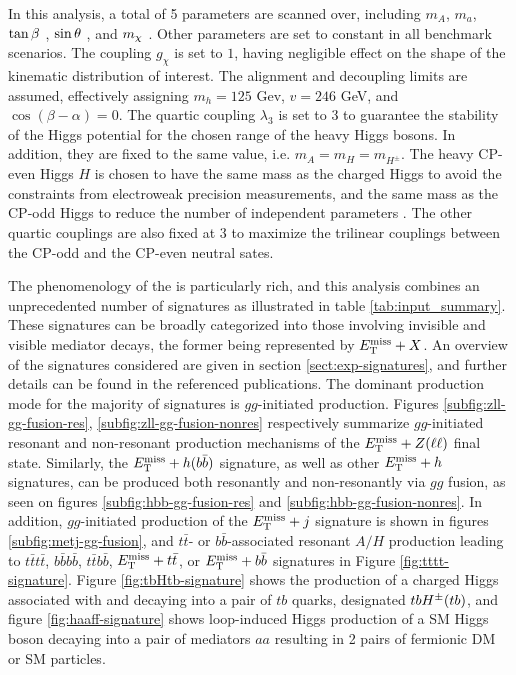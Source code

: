 In this analysis, a total of 5 parameters are scanned over, including $m_A$, $m_a$, $\tan\beta~$, $\sin\theta~$, and $m_{\chi}~$. Other parameters are set to constant in all benchmark scenarios. The coupling $g_{\chi}$ is set to $1$, having negligible effect on the shape of the kinematic distribution of interest. The alignment and decoupling limits are assumed, effectively assigning $m_h=125$ Gev, $v=246$ GeV, and $\cos(\beta-\alpha)=0$. The quartic coupling $\lambda_3$ is set to 3 to guarantee the stability of the Higgs potential for the chosen range of the heavy Higgs bosons. In addition, they are fixed to the same value, i.e. $m_A= m_H=m_{H^{\pm}}$. The heavy CP-even Higgs $H$ is chosen to have the same mass as the charged Higgs to avoid the constraints from electroweak precision measurements, and the same mass as the CP-odd Higgs to reduce the number of independent parameters \cite{Bauer:2017ota}. The other quartic couplings are also fixed at 3 to maximize the trilinear couplings between the CP-odd and the CP-even neutral sates. 

The phenomenology of the \thdma is particularly rich, and this analysis combines an unprecedented number of signatures as illustrated in table \ref{tab:input_summary}.
These signatures can be broadly categorized into those involving invisible and visible mediator decays, the former being represented by $E_{\mathrm{T}}^{\mathrm{miss}}+X$. An overview of the signatures considered are given in section \ref{sect:exp-signatures}, and further details can be found in the referenced publications. The dominant production mode for the majority of signatures is $gg$-initiated production. 
Figures \ref{subfig:zll-gg-fusion-res}, \ref{subfig:zll-gg-fusion-nonres} respectively summarize $gg$-initiated resonant and non-resonant production mechanisms of the $E_{\mathrm{T}}^{\mathrm{miss}}+Z(\ell\ell)$ final state. 
Similarly, the $E_{\mathrm{T}}^{\mathrm{miss}}+h(b\bar{b})$ signature, as well as other $E_{\mathrm{T}}^{\mathrm{miss}}+h$ signatures, can be produced both resonantly and non-resonantly via $gg$ fusion, as seen on figures \ref{subfig:hbb-gg-fusion-res} and \ref{subfig:hbb-gg-fusion-nonres}. 
In addition, $gg$-initiated production of the $E_{\mathrm{T}}^{\mathrm{miss}}+j$ signature is shown in figures \ref{subfig:metj-gg-fusion}, and $t\bar{t}$- or $b\bar{b}$-associated resonant $A/H$ production leading to $t\bar{t}t\bar{t}$, $b\bar{b}b\bar{b}$, $t\bar{t}b\bar{b}$, $E_{\mathrm{T}}^{\mathrm{miss}}+t\bar{t}$, or $E_{\mathrm{T}}^{\mathrm{miss}}+b\bar{b}$ signatures in Figure \ref{fig:tttt-signature}. 
Figure \ref{fig:tbHtb-signature} shows the production of a charged Higgs associated with and decaying into a pair of $tb$ quarks, designated $tbH^{\pm}(tb)$, and figure \ref{fig:haaff-signature} shows loop-induced Higgs production of a SM Higgs boson decaying into a pair of mediators $aa$ resulting in 2 pairs of fermionic DM or SM particles. 

